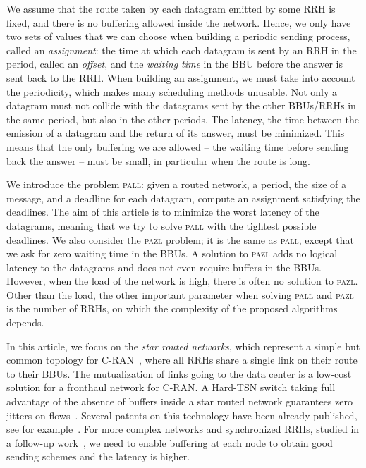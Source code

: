 \documentclass[a4paper,10pt]{journal}
\newcommand\pazl{\textsc{pazl}\xspace}
\newcommand\pall{\textsc{pall}\xspace}
\begin{document}
We assume that the route taken by each datagram emitted by some RRH is fixed, and there is no buffering allowed inside the network. Hence, we only have two sets of values that we can choose when building a periodic sending process, called an \emph{assignment}: the time at which each datagram is sent by an RRH in the period, called an \emph{offset}, and the \emph{waiting time} in the BBU before the answer is sent back to the RRH. 
When building an assignment, we must take into account the periodicity, which makes many scheduling methods unusable. Not only a datagram must not collide with the datagrams sent by the other BBUs/RRHs in the same period, but also in the other periods. The latency, the time between the emission of a datagram and the return of its answer, must be minimized. This means that the only buffering we are allowed -- the waiting time before sending back the answer -- must be small, in particular when the route is long.


We introduce the problem \pall: given a routed network, a period, the size of a message, and a deadline for each datagram, compute an assignment
satisfying the deadlines. The aim of this article is to minimize the worst latency of the datagrams, meaning that we try to solve \pall with the tightest possible deadlines.
We also consider the \pazl problem; it is the same as \pall, except that we ask for zero waiting time in the BBUs. A solution to \pazl 
adds no logical latency to the datagrams and does not even require buffers in the BBUs. However, when the load of the network is high, there is often no solution
to \pazl. Other than the load, the other important parameter when solving \pall and \pazl is the number of RRHs, on which the complexity of the proposed algorithms depends. 

In this article, we focus on the \emph{star routed networks}, which represent a simple but common topology for C-RAN~\cite{electronics9122131,bhattacharjee2020time},
where all RRHs share a single link on their route to their BBUs. The mutualization of links going to the data center is a low-cost solution for a fronthaul network for C-RAN.  
A Hard-TSN switch taking full advantage of the absence of buffers inside a star routed network guarantees zero jitters on flows~\cite{Marc2201:Experimental}. Several patents on this technology have been already published, see for example~\cite{howe2005time,leclerc2016transmission}. For more complex networks and synchronized RRHs, studied in a follow-up work~\cite{guiraud2021deterministic}, we need to enable buffering at each node to obtain good sending schemes and the latency is higher.
\end{document}

